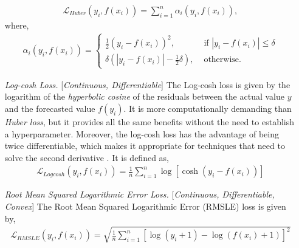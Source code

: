 \documentclass[nobib]{tufte-handout} %
\begin{document}
\begin{enumerate}
\begin{equation}
      \begin{split}
        \mathcal{L}_{Huber}(y_i, f(x_i)) = \sum^{n}_{i=1} \alpha_i(y_i, f(x_i)),
      \end{split}
    \end{equation}
    where, 
    \begin{equation*}
      \begin{split}
        \alpha_i(y_i, f(x_i)) =\begin{cases}
          \frac{1}{2} (y_i-f(x_i))^2, &\text{ if } |y_i -f(x_i) | \leq \delta \\  
          \delta\left( |y_i -f(x_i)| -\frac{1}{2}\delta \right), &\text{ otherwise.} 
        \end{cases}
      \end{split}
    \end{equation*}
    \item[\it Log-cosh Loss.][\textit{Continuous, Differentiable}] The Log-cosh loss is given by the logarithm of the \textit{hyperbolic cosine} of the residuals between the actual value $y$ and the forecasted value $f(y_i)$. It is more computationally demanding than \textit{Huber loss}, but it provides all the same benefits without the need to establish a hyperparameter. Moreover, the log-cosh loss has the advantage of being twice differentiable, which makes it appropriate for techniques that need to solve the second derivative \citep{ciampiconi2023survey}. It is defined as, 
  \begin{equation}
      \begin{split}
        \mathcal{L}_{Logcosh}(y_i, f(x_i)) = \frac{1}{n} \sum^{n}_{i=1} \log[\cosh(y_i-f(x_i))]
      \end{split}
    \end{equation}
    \item[\it Root Mean Squared Logarithmic Error Loss.][\textit{Continuous, Differentiable, Convex}] The Root Mean Squared Logarithmic Error (RMSLE) loss is given by,
\begin{equation}
      \begin{split}
        \mathcal{L}_{RMSLE}(y_i, f(x_i)) = \sqrt{\frac{1}{n} \sum^{n}_{i=1} [\log (y_i + 1) - \log(f(x_i)+1)]^2 }
      \end{split}
    \end{equation}


\end{enumerate}
\end{document}
